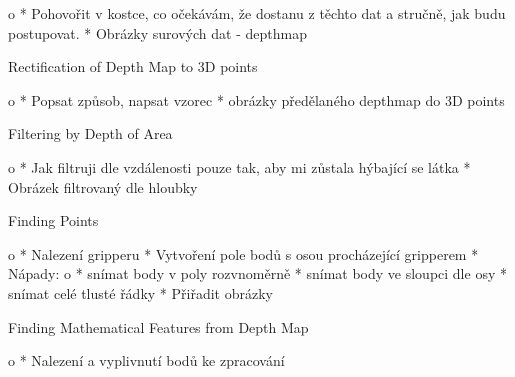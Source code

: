 		\Green
		\begitems \style o
			* Pohovořit v kostce, co očekávám, že dostanu z těchto dat a stručně, jak budu postupovat.
			* Obrázky surových dat - depthmap
		\enditems
		\Black

\secc Rectification of Depth Map to 3D points

		\Green
		\begitems \style o
			* Popsat způsob, napsat vzorec
			* obrázky předělaného depthmap do 3D points
		\enditems
		\Black

\secc Filtering by Depth of Area

		\Green
		\begitems \style o
			* Jak filtruji dle vzdálenosti pouze tak, aby mi zůstala hýbající se látka
			* Obrázek filtrovaný dle hloubky
		\enditems
		\Black

\secc Finding Points

		\Green
		\begitems \style o
			* Nalezení gripperu
			* Vytvoření pole bodů s osou procházející gripperem
			* Nápady:
				\begitems \style o
				* snímat body v poly rozvnoměrně
				* snímat body ve sloupci dle osy
				* snímat celé tlusté řádky
				\enditems
			* Přiřadit obrázky
		\enditems
		\Black

\secc Finding Mathematical Features from Depth Map

		\Green
		\begitems \style o
			* Nalezení a vyplivnutí bodů ke zpracování
		\enditems
		\Black
